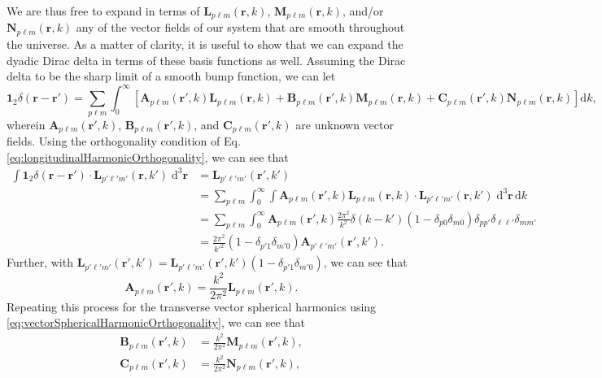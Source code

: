 \documentclass{article}
\begin{document}
We are thus free to expand in terms of $\mathbf{L}_{p\ell m}(\mathbf{r},k)$, $\mathbf{M}_{p\ell m}(\mathbf{r},k)$, and/or $\mathbf{N}_{p\ell m}(\mathbf{r},k)$ any of the vector fields of our system that are smooth throughout the universe. As a matter of clarity, it is useful to show that we can expand the dyadic Dirac delta in terms of these basis functions as well. Assuming the Dirac delta to be the sharp limit of a smooth bump function, we can let 
\begin{equation}
\bm{1}_2\delta(\mathbf{r} - \mathbf{r}') = \sum_{p\ell m}\int_0^\infty\left[\mathbf{A}_{p\ell m}(\mathbf{r}',k)\mathbf{L}_{p\ell m}(\mathbf{r},k) + \mathbf{B}_{p\ell m}(\mathbf{r}',k)\mathbf{M}_{p\ell m}(\mathbf{r},k) + \mathbf{C}_{p\ell m}(\mathbf{r}',k)\mathbf{N}_{p\ell m}(\mathbf{r},k)\right]\mathrm{d}k,
\end{equation}
wherein $\mathbf{A}_{p\ell m}(\mathbf{r}',k)$, $\mathbf{B}_{p\ell m}(\mathbf{r}',k)$, and $\mathbf{C}_{p\ell m}(\mathbf{r}',k)$ are unknown vector fields. Using the orthogonality condition of Eq. \eqref{eq:longitudinalHarmonicOrthogonality}, we can see that
\begin{equation}
\begin{split}
\int\bm{1}_2\delta(\mathbf{r} - \mathbf{r}')\cdot\mathbf{L}_{p'\ell'm'}(\mathbf{r},k')\;\mathrm{d}^3\mathbf{r} &= \mathbf{L}_{p'\ell'm'}(\mathbf{r}',k')\\
&= \sum_{p\ell m}\int_0^\infty\int\mathbf{A}_{p\ell m}(\mathbf{r}',k)\mathbf{L}_{p\ell m}(\mathbf{r},k)\cdot\mathbf{L}_{p'\ell'm'}(\mathbf{r},k')\;\mathrm{d}^3\mathbf{r}\,\mathrm{d}k\\
&= \sum_{p\ell m}\int_0^\infty\mathbf{A}_{p\ell m}(\mathbf{r}',k)\frac{2\pi^2}{k^2}\delta(k - k')(1 - \delta_{p0}\delta_{m0})\delta_{pp'}\delta_{\ell\ell'}\delta_{mm'}\\
&= \frac{2\pi^2}{k'^2}(1 - \delta_{p'1}\delta_{m'0})\mathbf{A}_{p'\ell'm'}(\mathbf{r}',k').
\end{split}
\end{equation}
Further, with $\mathbf{L}_{p'\ell'm'}(\mathbf{r}',k') = \mathbf{L}_{p'\ell'm'}(\mathbf{r}',k')(1 - \delta_{p'1}\delta_{m'0})$, we can see that
\begin{equation}
\mathbf{A}_{p\ell m}(\mathbf{r}',k) = \frac{k^2}{2\pi^2}\mathbf{L}_{p\ell m}(\mathbf{r}',k).
\end{equation}
Repeating this process for the transverse vector spherical harmonics using \eqref{eq:vectorSphericalHarmonicOrthogonality}, we can see that
\begin{equation}
\begin{split}
\mathbf{B}_{p\ell m}(\mathbf{r}',k) &= \frac{k^2}{2\pi^2}\mathbf{M}_{p\ell m}(\mathbf{r}',k),\\
\mathbf{C}_{p\ell m}(\mathbf{r}',k) &= \frac{k^2}{2\pi^2}\mathbf{N}_{p\ell m}(\mathbf{r}',k),
\end{split}
\end{equation}
\end{document}
